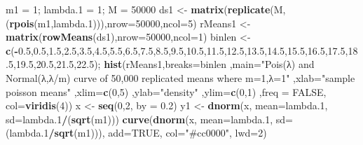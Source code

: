\documentclass[
]{article}
\newenvironment{Shaded}{\begin{snugshade}}{\end{snugshade}}
\newcommand{\DataTypeTok}[1]{\textcolor[rgb]{0.13,0.29,0.53}{#1}}
\newcommand{\DecValTok}[1]{\textcolor[rgb]{0.00,0.00,0.81}{#1}}
\newcommand{\FloatTok}[1]{\textcolor[rgb]{0.00,0.00,0.81}{#1}}
\newcommand{\KeywordTok}[1]{\textcolor[rgb]{0.13,0.29,0.53}{\textbf{#1}}}
\newcommand{\NormalTok}[1]{#1}
\newcommand{\OperatorTok}[1]{\textcolor[rgb]{0.81,0.36,0.00}{\textbf{#1}}}
\newcommand{\OtherTok}[1]{\textcolor[rgb]{0.56,0.35,0.01}{#1}}
\newcommand{\StringTok}[1]{\textcolor[rgb]{0.31,0.60,0.02}{#1}}
\begin{document}
\begin{Shaded}
\begin{Highlighting}[]
\NormalTok{m1 =}\StringTok{ }\DecValTok{1}\NormalTok{; lambda}\FloatTok{.1}\NormalTok{ =}\StringTok{ }\DecValTok{1}\NormalTok{; M =}\StringTok{ }\DecValTok{50000}
\NormalTok{ds1 <-}\StringTok{ }\KeywordTok{matrix}\NormalTok{(}\KeywordTok{replicate}\NormalTok{(M,(}\KeywordTok{rpois}\NormalTok{(m1,lambda}\FloatTok{.1}\NormalTok{))),}\DataTypeTok{nrow=}\DecValTok{50000}\NormalTok{,}\DataTypeTok{ncol=}\DecValTok{5}\NormalTok{)}
\NormalTok{rMeans1 <-}\StringTok{ }\KeywordTok{matrix}\NormalTok{(}\KeywordTok{rowMeans}\NormalTok{(ds1),}\DataTypeTok{nrow=}\DecValTok{50000}\NormalTok{,}\DataTypeTok{ncol=}\DecValTok{1}\NormalTok{)}
\NormalTok{binlen <-}\StringTok{ }\KeywordTok{c}\NormalTok{(}\OperatorTok{-}\FloatTok{0.5}\NormalTok{,}\FloatTok{0.5}\NormalTok{,}\FloatTok{1.5}\NormalTok{,}\FloatTok{2.5}\NormalTok{,}\FloatTok{3.5}\NormalTok{,}\FloatTok{4.5}\NormalTok{,}\FloatTok{5.5}\NormalTok{,}\FloatTok{6.5}\NormalTok{,}\FloatTok{7.5}\NormalTok{,}\FloatTok{8.5}\NormalTok{,}\FloatTok{9.5}\NormalTok{,}\FloatTok{10.5}\NormalTok{,}\FloatTok{11.5}\NormalTok{,}\FloatTok{12.5}\NormalTok{,}\FloatTok{13.5}\NormalTok{,}\FloatTok{14.5}\NormalTok{,}\FloatTok{15.5}\NormalTok{,}\FloatTok{16.5}\NormalTok{,}\FloatTok{17.5}\NormalTok{,}\FloatTok{18.5}\NormalTok{,}\FloatTok{19.5}\NormalTok{,}\FloatTok{20.5}\NormalTok{,}\FloatTok{21.5}\NormalTok{,}\FloatTok{22.5}\NormalTok{);}
\KeywordTok{hist}\NormalTok{(rMeans1,}\DataTypeTok{breaks=}\NormalTok{binlen ,}\DataTypeTok{main=}\StringTok{"Pois(λ) and Normal(λ,λ/m) curve of 50,000 replicated means where m=1,λ=1"}\NormalTok{ ,}\DataTypeTok{xlab=}\StringTok{"sample poisson means"}\NormalTok{ ,}\DataTypeTok{xlim=}\KeywordTok{c}\NormalTok{(}\DecValTok{0}\NormalTok{,}\DecValTok{5}\NormalTok{) ,}\DataTypeTok{ylab=}\StringTok{"density"}\NormalTok{ ,}\DataTypeTok{ylim=}\KeywordTok{c}\NormalTok{(}\DecValTok{0}\NormalTok{,}\DecValTok{1}\NormalTok{) ,}\DataTypeTok{freq =} \OtherTok{FALSE}\NormalTok{, }\DataTypeTok{col=}\KeywordTok{viridis}\NormalTok{(}\DecValTok{4}\NormalTok{))}
\NormalTok{x <-}\StringTok{ }\KeywordTok{seq}\NormalTok{(}\DecValTok{0}\NormalTok{,}\DecValTok{2}\NormalTok{, }\DataTypeTok{by =} \FloatTok{0.2}\NormalTok{)}
\NormalTok{y1 <-}\StringTok{ }\KeywordTok{dnorm}\NormalTok{(x, }\DataTypeTok{mean=}\NormalTok{lambda}\FloatTok{.1}\NormalTok{, }\DataTypeTok{sd=}\NormalTok{lambda}\FloatTok{.1}\OperatorTok{/}\NormalTok{(}\KeywordTok{sqrt}\NormalTok{(m1)))}
\KeywordTok{curve}\NormalTok{(}\KeywordTok{dnorm}\NormalTok{(x, }\DataTypeTok{mean=}\NormalTok{lambda}\FloatTok{.1}\NormalTok{, }\DataTypeTok{sd=}\NormalTok{(lambda}\FloatTok{.1}\OperatorTok{/}\KeywordTok{sqrt}\NormalTok{(m1))), }\DataTypeTok{add=}\OtherTok{TRUE}\NormalTok{, }\DataTypeTok{col=}\StringTok{"#cc0000"}\NormalTok{, }\DataTypeTok{lwd=}\DecValTok{2}\NormalTok{)}
\end{Highlighting}
\end{Shaded}
\end{document}
